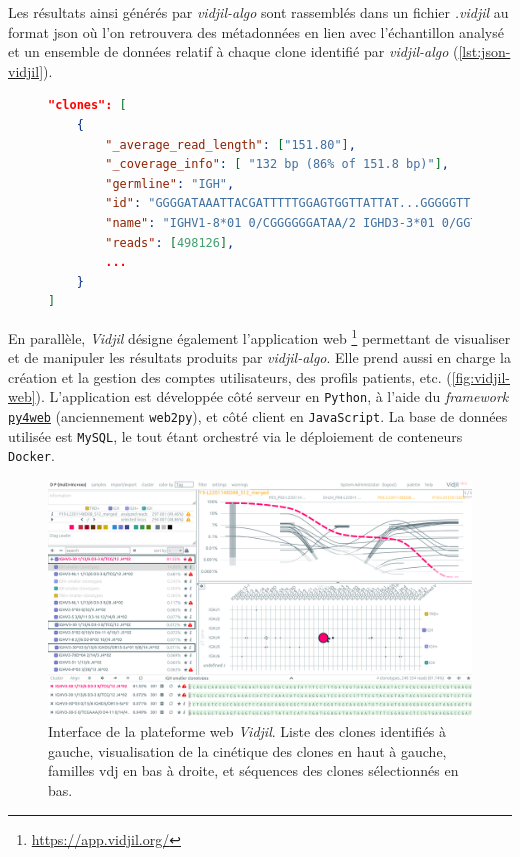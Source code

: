 

Les résultats ainsi générés par \textit{vidjil-algo} sont rassemblés dans un
fichier \textit{.vidjil} au format \gls{json} où l'on retrouvera des
métadonnées en lien avec l'échantillon analysé et un ensemble de données
relatif à chaque clone identifié par \textit{vidjil-algo}
(\autoref{lst:json-vidjil}).

\begin{figure}[H]
    \begin{lstlisting}[language=json, 
caption={Extrait d'une sortie de \textit{vidjil-algo}.},
label={lst:json-vidjil}]
"clones": [
    {
        "_average_read_length": ["151.80"],
        "_coverage_info": [ "132 bp (86% of 151.8 bp)"],
        "germline": "IGH",
        "id": "GGGGATAAATTACGATTTTTGGAGTGGTTATTAT...GGGGGTT",
        "name": "IGHV1-8*01 0/CGGGGGGATAA/2 IGHD3-3*01 0/GGTATGGGGGGTTTTAG/7 IGHJ4*02",
        "reads": [498126],
        ...
    }
]
\end{lstlisting}
\end{figure}

En parallèle, \textit{Vidjil} désigne également l'application web
\footnote{\url{https://app.vidjil.org/}} permettant de visualiser et de
manipuler les résultats produits par \textit{vidjil-algo}. Elle prend aussi en
charge la création et la gestion des comptes utilisateurs, des profils
patients, etc. (\autoref{fig:vidjil-web}). L'application est développée côté
serveur en \texttt{Python}, à l'aide du \textit{framework}
\href{https://py4web.com}{\texttt{py4web}} (anciennement \texttt{web2py}), et
côté client en \texttt{JavaScript}. La base de données utilisée est
\texttt{MySQL}, le tout étant orchestré via le déploiement de conteneurs
\texttt{Docker}.

\begin{figure}[H]
    \centering
    \includegraphics[width=1\textwidth]{images/vidjil-web.png}
    \caption{Interface de la plateforme web \textit{Vidjil}.
        Liste des clones identifiés à gauche, visualisation de la cinétique des clones en haut à gauche,
        familles \gls{vdj} en bas à droite, et séquences des clones sélectionnés en bas.}
    \label{fig:vidjil-web}
\end{figure}


